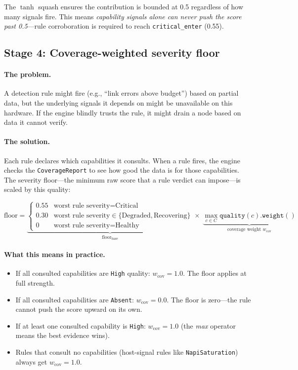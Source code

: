\documentclass[11pt]{article}
\begin{document}
The $\tanh$ squash ensures the contribution is bounded at 0.5 regardless of
how many signals fire. This means \emph{capability signals alone can never
push the score past 0.5}---rule corroboration is required to reach
\texttt{critical\_enter} (0.55).


\subsection{Stage 4: Coverage-weighted severity floor}
\label{sec:coverage-floor}

\paragraph{The problem.}
A detection rule might fire (e.g., ``link errors above budget'') based on
partial data, but the underlying signals it depends on might be unavailable
on this hardware. If the engine blindly trusts the rule, it might drain a node
based on data it cannot verify.

\paragraph{The solution.}
Each rule declares which capabilities it consults. When a rule fires, the
engine checks the \texttt{CoverageReport} to see how good the data is for
those capabilities. The severity floor---the minimum raw score that a rule
verdict can impose---is scaled by this quality:

\[
\text{floor} = \underbrace{
  \begin{cases}
    0.55 & \text{worst rule severity} = \text{Critical} \\
    0.30 & \text{worst rule severity} \in \{\text{Degraded}, \text{Recovering}\} \\
    0    & \text{worst rule severity} = \text{Healthy}
  \end{cases}
}_{\text{floor}_\text{base}}
\times\;
\underbrace{\max_{c \in C} \texttt{quality}(c).\texttt{weight}()}_{\text{coverage weight } w_\text{cov}}
\]

\paragraph{What this means in practice.}
\begin{itemize}[nosep]
  \item If all consulted capabilities are \texttt{High} quality:
        $w_\text{cov} = 1.0$. The floor applies at full strength.
  \item If all consulted capabilities are \texttt{Absent}:
        $w_\text{cov} = 0.0$. The floor is zero---the rule cannot
        push the score upward on its own.
  \item If at least one consulted capability is \texttt{High}:
        $w_\text{cov} = 1.0$ (the \emph{max} operator means the best
        evidence wins).
  \item Rules that consult no capabilities (host-signal rules like
        \texttt{NapiSaturation}) always get $w_\text{cov} = 1.0$.
\end{itemize}
\end{document}
